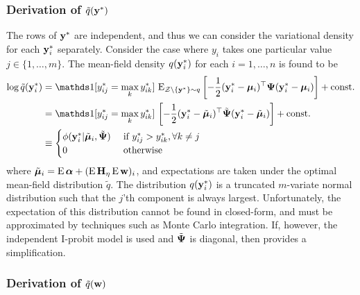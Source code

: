 \subsubsection[Derivation of q ystar]{Derivation of $\tilde q({\mathbf y}^*)$}

The rows of ${\mathbf y}^*$ are independent, and thus we can consider the variational density for each ${\mathbf y}_i^*$ separately.
Consider the case where $y_i$ takes one particular value $j \in \{1,\dots,m\}$. The mean-field density $q({\mathbf y}_{i}^*)$ for each $i=1,\dots,n$ is found to be
\begin{align*}
  \log \tilde q(\by_{i}^*) 
  &=  \ind[y_{ij}^* = \max_k y_{ik}^*] \, \E_{\cZ\backslash\{\by^*\}\sim q} \left[ - \half (\by^*_i - \bmu_i)^\top \bPsi (\by^*_i - \bmu_i)  \right] + \const \\
  &= \ind[y_{ij}^* = \max_k y_{ik}^*] \, \left[ - \half (\by^*_i - \tilde\bmu_i)^\top \tilde\bPsi (\by^*_i - \tilde\bmu_i)  \right] + \const \\
  &\equiv
  \begin{cases}
    \phi(\by_i^*|\tilde\bmu_i,\tilde\bPsi) & \text{ if } y_{ij}^* > y_{ik}^*, \forall k \neq j \\
    0 & \text{ otherwise} \\
  \end{cases}
\end{align*}
where $\tilde{{\bm\mu}}_i = \operatorname{E}{\bm\alpha} + (\operatorname{E}{\mathbf H}_\eta \operatorname{E}{\mathbf w})_i$, and expectations are taken under the optimal mean-field distribution $\tilde q$. 
The distribution $q({\mathbf y}_i^*)$ is a truncated $m$-variate normal distribution such that the $j$'th component is always largest. 
Unfortunately, the expectation of this distribution cannot be found in closed-form, and must be approximated by techniques such as Monte Carlo integration.
If, however, the independent I-probit model is used and $\tilde{{\bm\Psi}}$ is diagonal, then  provides a simplification.

\subsubsection{Derivation of $\tilde q({\mathbf w})$}

